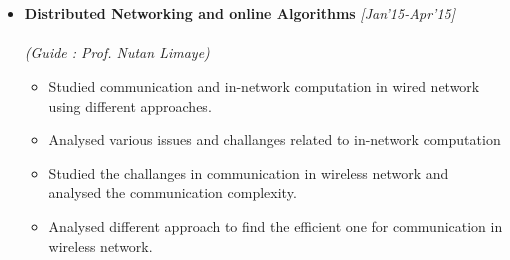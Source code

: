 \\[-.9cm]\\
\begin{itemize}
\item \textbf{Distributed Networking and online Algorithms}  \hfill {\emph{[Jan'15-Apr'15]}} \\[-0.3cm]\\
      \emph{(Guide : Prof. Nutan Limaye)} \\[-0.6cm]
      \begin{itemize}
	    \item Studied communication and in-network computation in wired network using different approaches.\\[-0.5cm]
	    \item Analysed various issues and challanges related to in-network computation\\[-0.5cm]
	    \item Studied the challanges in communication in wireless network and analysed the communication complexity.\\[-0.5cm]
	    \item Analysed different approach to find the efficient one for communication in wireless network.\\[-0.5cm]
      \end{itemize}
\end{itemize}
